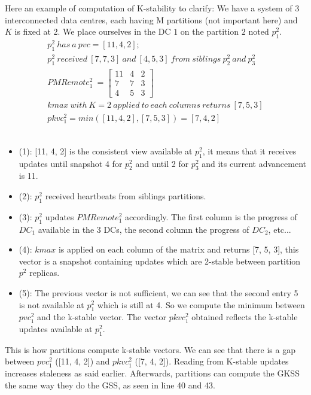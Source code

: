 \documentclass[11pt]{article}
\newcommand\bulletitem{\item[$\bullet$]}
\begin{document}
Here an example of computation of K-stability to clarify: We have a system of
3 interconnected data centres, each having M partitions (not important here)
and $K$ is fixed at 2. We place ourselves in the DC $1$ on the partition $2$
noted $p_1^2$.
\setcounter{equation}{0}
\begin{gather}
	p_1^2 \ has\ a\ pvc = [11, 4, 2]; \\
	p_1^2\ received\ [7, 7, 3]\ and\ [4, 5, 3]\ from\ siblings\ p_2^2\ and\ p_3^2\\
	PMRemote_1^2\ =
	\begin{bmatrix} 
	11 & 4 & 2\\
	7 & 7 & 3\\
	4 & 5 & 3 
	\end{bmatrix} \\
	kmax\ with\ K = 2\ applied\ to\ each\ columns\ returns\ [7, 5, 3] \\
	pkvc_1^2 = min([11, 4, 2], [7, 5, 3]) = [7, 4, 2]
\end{gather}\\

\begin{itemize}
	\bulletitem (1): [11, 4, 2] is the consistent view available at $p_1^2$,
	it means that it receives updates until snapshot 4 for $p_2^2$ and until
	2 for $p_3^2$ and its current advancement is 11.
	\bulletitem (2): $p_1^2$ received heartbeats from siblings partitions.
	\bulletitem (3): $p_1^2$ updates $PMRemote_1^2$ accordingly. The first
	column is the progress of $DC_1$ available in the 3 DCs, the second column
	the progress of $DC_2$, etc...
	\bulletitem (4): $kmax$ is applied on each column of the matrix and
	returns [7, 5, 3], this vector is a snapshot containing updates which are
	2-stable between partition $p^2$ replicas.
	\bulletitem (5): The previous vector is not sufficient, we can see that
	the second entry 5 is not available at $p_1^2$ which is still at 4. So we
	compute the minimum between $pvc_1^2$ and the k-stable vector. The vector
	$pkvc_1^2$ obtained reflects the k-stable updates available at $p_1^2$.
\end{itemize}

This is how partitions compute k-stable vectors. We can see that there is a
gap between $pvc_1^2$ ([11, 4, 2]) and $pkvc_1^2$ ([7, 4, 2]). Reading from
K-stable updates increases staleness as said earlier. Afterwards, partitions
can compute the GKSS the same way they do the GSS, as seen in line 40 and 43.

\newcommand*{\myalign}[2]{\multicolumn{1}{#1}{#2}}
\end{document}
